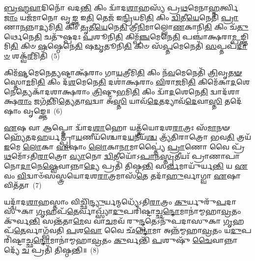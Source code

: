 {\anuvakamend[{𑌵𑍍𑌯𑌾\-\ul{𑌹} 𑌸 𑌦𑍃᳴\-\ul{𑌶𑍀}\-𑌕𑌵𑍋॑\-𑌽\-\ul{𑌰𑍍𑌚𑌿}\-𑌤𑌾\-\ul{𑌰𑌃} 𑌸 𑌏𑌕᳴𑌞𑍍𑌚}]}%

\-\ul{𑌬𑍍𑌰}\-\-\ul{𑌹𑍍𑌮}\-\-\ul{𑌵𑌾}\-𑌦𑌿𑌨𑍋᳴ 𑌵𑌦\-\ul{𑌨𑍍𑌤𑌿} 𑌕𑌿𑌂 𑌦𑍍𑌵𑌾᳴𑌦\-\ul{𑌶𑌾}\-𑌹𑌸𑍍𑌯᳴ 𑌪𑍍𑌰\-\ul{𑌥}\-𑌮𑍇𑌨𑌾\-\ul{𑌹𑍍𑌨}\-𑌰𑍍𑌤𑍍𑌵𑌿\-\ul{𑌜𑌾𑌂} 𑌯𑌜᳴𑌮𑌾𑌨𑍋 𑌵𑍃\-\ul{𑌙𑍍𑌕𑍍𑌤} 𑌇\-\ul{𑌤𑌿} 𑌤𑍇𑌜᳴ 𑌇\-\ul{𑌨𑍍𑌦𑍍𑌰𑌿}\-𑌯𑌮𑌿\-\ul{𑌤𑌿} 𑌕𑌿𑌂 \ul{𑌦𑍍𑌵𑌿}\-𑌤𑍀\-\ul{𑌯𑍇}\-𑌨𑍇𑌤𑌿᳴ \ul{𑌪𑍍𑌰𑌾}\-𑌣𑌾\-\ul{𑌨}\-𑌨𑍍𑌨𑌾\-\ul{𑌦𑍍𑌯}\-𑌮𑌿\-\ul{𑌤𑌿} 𑌕𑌿𑌂 \ul{𑌤𑍃}\-𑌤𑍀\-\ul{𑌯𑍇}\-𑌨𑍇\-\ul{𑌤𑌿} 𑌤𑍍𑌰𑍀\-\ul{𑌨𑌿}\-𑌮𑌾𑌲𑍍𑌲𑍋\-\ul{𑌣}\-𑌕𑌾𑌨𑌿\-\ul{𑌤𑌿} 𑌕𑌿𑌂 𑌚᳴\-\ul{𑌤𑍁}\-𑌰𑍍𑌥𑍇𑌨𑍇\-\ul{𑌤𑌿} 𑌚𑌤𑍁᳴𑌷𑍍𑌪𑌦𑌃 \ul{𑌪}\-𑌶𑍂𑌨𑌿\-\ul{𑌤𑌿} 𑌕𑌿𑌮𑍍𑌪᳴\-\ul{𑌞𑍍𑌚}\-𑌮𑍇𑌨𑍇\-\ul{𑌤𑌿} 𑌪𑌞𑍍𑌚𑌾॑𑌕𑍍𑌷𑌰𑌾\-\ul{𑌮𑍍𑌪}\-𑌙𑍍𑌕𑍍𑌤𑌿𑌮𑌿\-\ul{𑌤𑌿} 𑌕𑌿𑍞 \ul{𑌷}\-𑌷𑍍𑌠𑍇𑌨𑍇\-\ul{𑌤𑌿} 𑌷\-\ul{𑌡𑍃}\-𑌤𑍂𑌨𑌿\-\ul{𑌤𑌿} 𑌕𑌿𑍞 𑌸᳴\-\ul{𑌪𑍍𑌤}\-𑌮𑍇𑌨𑍇𑌤𑌿᳴ \ul{𑌸}\-𑌪𑍍𑌤𑌪᳴\-\ul{𑌦𑌾}\-\-\ul{𑍞} 𑌶𑌕𑍍𑌵᳴\-\ul{𑌰𑍀}\-𑌮𑌿𑌤𑌿᳴~(5)

𑌕𑌿𑌮᳴\-\ul{𑌷𑍍𑌟}\-𑌮𑍇𑌨𑍇\-\ul{𑌤𑍍𑌯}\-𑌷𑍍𑌟𑌾𑌕𑍍𑌷᳴𑌰𑌾𑌂 𑌗𑌾\-\ul{𑌯}\-𑌤𑍍𑌰𑍀𑌮𑌿\-\ul{𑌤𑌿} 𑌕𑌿𑌂 𑌨᳴\-\ul{𑌵}\-𑌮𑍇𑌨𑍇𑌤𑌿᳴ \ul{𑌤𑍍𑌰𑌿}\-𑌵𑍃\-\ul{𑌤}\-\-\ul{𑍟} 𑌸𑍍𑌤𑍋\-\ul{𑌮}\-𑌮𑌿\-\ul{𑌤𑌿} 𑌕𑌿𑌂 𑌦᳴\-\ul{𑌶}\-𑌮𑍇𑌨𑍇\-\ul{𑌤𑌿} 𑌦𑌶𑌾॑𑌕𑍍𑌷𑌰𑌾𑌂 \ul{𑌵𑌿}\-𑌰𑌾\-\ul{𑌜}\-𑌮𑌿\-\ul{𑌤𑌿} 𑌕𑌿𑌮𑍇᳴𑌕𑌾\-\ul{𑌦}\-𑌶𑍇𑌨𑍇𑌤𑍍𑌯𑍇𑌕𑌾᳴\-𑌦𑌶𑌾𑌕𑍍𑌷𑌰𑌾𑌂 \ul{𑌤𑍍𑌰𑌿}\-𑌷𑍍𑌟𑍁\-\ul{𑌭}\-𑌮𑌿\-\ul{𑌤𑌿} 𑌕𑌿𑌂 𑌦𑍍𑌵𑌾᳴\-\ul{𑌦}\-𑌶𑍇𑌨𑍇\-\ul{𑌤𑌿} 𑌦𑍍𑌵𑌾𑌦᳴𑌶𑌾𑌕𑍍𑌷\-\ul{𑌰𑌾𑌂} 𑌜𑌗᳴\-\ul{𑌤𑍀}\-𑌮𑌿\-\ul{𑌤𑍍𑌯𑍇}\-𑌤𑌾\-\ul{𑌵}\-𑌦𑍍𑌵𑌾 𑌅᳴\-\ul{𑌸𑍍𑌤𑌿} 𑌯𑌾𑌵᳴\-\ul{𑌦𑍇}\-𑌤𑌦𑍍𑌯𑌾𑌵᳴\-\ul{𑌦𑍇}\-𑌵𑌾\-\ul{𑌸𑍍𑌤𑌿} 𑌤𑌦𑍇᳴𑌷𑌾𑌂 𑌵𑍃𑌙𑍍𑌕𑍍𑌤𑍇॥~(6)

{\anuvakamend[{𑌶𑌕𑍍𑌵᳴\-\ul{𑌰𑍀}\-𑌮𑌿𑌤𑍍𑌯𑍇𑌕᳴𑌚𑌤𑍍𑌵𑌾𑌰𑌿𑍞𑌶𑌚𑍍𑌚}]}%

\-\ul{𑌏}\-𑌷 𑌵𑌾 \ul{𑌆}\-𑌪𑍍𑌤𑍋 𑌦𑍍𑌵𑌾᳴𑌦\-\ul{𑌶𑌾}\-𑌹𑍋 𑌯𑌤𑍍𑌤𑍍𑌰᳴𑌯𑍋𑌦𑌶\-\ul{𑌰𑌾}\-𑌤𑍍𑌰𑌃 𑌸᳴\-\ul{𑌮𑌾}\-𑌨𑍟 𑌹𑍍𑌯𑍇᳴𑌤𑌦\-\ul{𑌹}\-𑌰𑍍𑌯𑌤𑍍𑌪𑍍𑌰𑌾᳴\-\ul{𑌯}\-𑌣𑍀𑌯᳴𑌶𑍍𑌚𑍋𑌦\-\ul{𑌯}\-𑌨𑍀𑌯᳴\-\ul{𑌶𑍍𑌚} 𑌤𑍍𑌰𑍍𑌯᳴𑌤𑌿𑌰𑌾𑌤𑍍𑌰𑍋 𑌭𑌵\-\ul{𑌤𑌿} 𑌤𑍍𑌰𑌯᳴ \ul{𑌇}\-𑌮𑍇 \ul{𑌲𑍋}\-𑌕𑌾 \ul{𑌏}\-𑌷𑌾𑌂 \ul{𑌲𑍋}\-𑌕𑌾\-\ul{𑌨𑌾}\-𑌮𑌾𑌪𑍍𑌤𑍍𑌯𑍈॑ \ul{𑌪𑍍𑌰𑌾}\-𑌣𑍋 𑌵𑍈 𑌪𑍍𑌰᳴\-\ul{𑌥}\-𑌮𑍋᳴\-𑌽𑌤𑌿\-\ul{𑌰𑌾}\-𑌤𑍍𑌰𑍋 \ul{𑌵𑍍𑌯𑌾}\-𑌨𑍋 \ul{𑌦𑍍𑌵𑌿}\-𑌤𑍀𑌯𑍋᳴\-𑌽\-\ul{𑌪𑌾}\-𑌨\-\ul{𑌸𑍍𑌤𑍃}\-𑌤𑍀𑌯𑌃᳴ 𑌪𑍍𑌰𑌾𑌣𑌾𑌪𑌾𑌨𑍋\-\ul{𑌦𑌾}\-𑌨𑍇\-\ul{𑌷𑍍𑌵𑍇}\-𑌵𑌾𑌨𑍍𑌨𑌾\-\ul{𑌦𑍍𑌯𑍇} 𑌪𑍍𑌰𑌤𑌿᳴ 𑌤𑌿𑌷𑍍𑌠\-\ul{𑌨𑍍𑌤𑌿} 𑌸\-\ul{𑌰𑍍𑌵}\-𑌮𑌾𑌯𑍁᳴𑌰𑍍𑌯\-\ul{𑌨𑍍𑌤𑌿} 𑌯 \ul{𑌏}\-𑌵𑌂 \ul{𑌵𑌿}\-𑌦𑍍𑌵𑌾𑍞᳴𑌸𑌸𑍍𑌤𑍍𑌰𑌯𑍋𑌦𑌶\-\ul{𑌰𑌾}\-𑌤𑍍𑌰𑌮𑌾𑌸᳴\-\ul{𑌤𑍇} 𑌤𑌦𑌾᳴\-\ul{𑌹𑍁}\-𑌰𑍍𑌵𑌾𑌗𑍍𑌵𑌾 \ul{𑌏}\-𑌷𑌾 𑌵𑌿𑌤᳴𑌤𑌾~(7)

𑌯𑌦𑍍𑌦𑍍𑌵𑌾᳴𑌦\-\ul{𑌶𑌾}\-𑌹𑌸𑍍𑌤𑌾𑌂 𑌵𑌿𑌚𑍍𑌛𑌿᳴\-\ul{𑌨𑍍𑌦𑍍𑌯𑍁}\-𑌰𑍍𑌯𑌨𑍍𑌮𑌧𑍍𑌯𑍇᳴\-𑌽𑌤𑌿\-\ul{𑌰𑌾}\-𑌤𑍍𑌰𑌂 \ul{𑌕𑍁}\-𑌰𑍍𑌯𑍁𑌰𑍁᳴\-\ul{𑌪}\-𑌦𑌾𑌸𑍁᳴𑌕𑌾 \ul{𑌗𑍃}\-𑌹𑌪᳴\-\ul{𑌤𑍇}\-𑌰𑍍𑌵𑌾𑌖𑍍𑌸𑍍𑌯𑌾᳴\-\ul{𑌦𑍁}\-𑌪𑌰𑌿᳴𑌷𑍍𑌟𑌾𑌚𑍍𑌛\-\ul{𑌨𑍍𑌦𑍋}\-𑌮𑌾𑌨𑌾॑𑌮𑍍𑌮𑌹𑌾\-\ul{𑌵𑍍𑌰}\-𑌤𑌂 𑌕𑍁᳴𑌰𑍍𑌵\-\ul{𑌨𑍍𑌤𑌿} 𑌸𑌨𑍍𑌤᳴𑌤𑌾\-\ul{𑌮𑍇}\-𑌵 𑌵𑌾\-\ul{𑌚}\-𑌮𑌵᳴ 𑌰𑍁\-\ul{𑌨𑍍𑌦𑍍𑌧}\-𑌤𑍇\-𑌽𑌨𑍁᳴𑌪𑌦𑌾𑌸𑍁𑌕𑌾 \ul{𑌗𑍃}\-𑌹𑌪᳴\-\ul{𑌤𑍇}\-𑌰𑍍𑌵𑌾𑌗𑍍𑌭᳴𑌵𑌤𑌿 \ul{𑌪}\-𑌶\-\ul{𑌵𑍋} 𑌵𑍈 𑌛᳴\-\ul{𑌨𑍍𑌦𑍋}\-𑌮𑌾 𑌅𑌨𑍍𑌨᳴𑌮𑍍𑌮𑌹𑌾\-\ul{𑌵𑍍𑌰}\-𑌤𑌂 𑌯\-\ul{𑌦𑍁}\-𑌪𑌰𑌿᳴𑌷𑍍𑌟𑌾𑌚𑍍𑌛\-\ul{𑌨𑍍𑌦𑍋}\-𑌮𑌾𑌨𑌾॑\-𑌮𑍍𑌮𑌹𑌾\-\ul{𑌵𑍍𑌰}\-𑌤𑌂 \ul{𑌕𑍁}\-𑌰𑍍𑌵𑌨𑍍𑌤𑌿᳴ \ul{𑌪}\-𑌶𑍁𑌷𑍁᳴ \ul{𑌚𑍈}\-𑌵𑌾𑌨𑍍𑌨𑌾𑌦𑍍𑌯𑍇᳴ \ul{𑌚} 𑌪𑍍𑌰𑌤𑌿᳴ 𑌤𑌿𑌷𑍍𑌠𑌨𑍍𑌤𑌿॥~(8)

